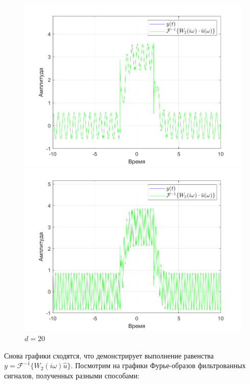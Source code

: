 \documentclass[a4paper]{article}
\begin{document}
\begin{figure}[H]
    \begin{minipage}{0.5\textwidth}
        \centering
        \includegraphics[width=\linewidth]{ex1_2/a1=0_a2=25_b1=10.5_b2=25_d=10/h3.png}
        \caption{$d=10$}
    \end{minipage}
    \begin{minipage}{0.5\textwidth}
        \centering
        \includegraphics[width=\linewidth]{ex1_2/a1=0_a2=25_b1=10.5_b2=25_d=20/h3.png}
        \caption{$d=20$}
    \end{minipage}
\end{figure}

Снова графики сходятся, что демонстрирует выполнение равенства $y = \mathcal{F}^{-1}\{W_2(i \omega) \hat{u}\}$. Посмотрим на графики Фурье-образов фильтрованных сигналов, полученных разными способами:
\end{document}
